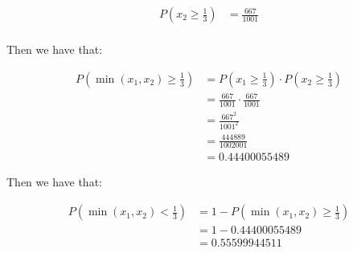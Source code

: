 \begin{equation*}
    \begin{split}
        P(x_2 \geq \frac{1}{3}) & = \frac{667}{1001} \\
    \end{split}
\end{equation*}

Then we have that:

\begin{equation*}
    \begin{split}
        P(\min(x_1, x_2) \geq \frac{1}{3}) & = P(x_1 \geq \frac{1}{3}) \cdot P(x_2 \geq \frac{1}{3}) \\
                                           & = \frac{667}{1001} \cdot \frac{667}{1001}               \\
                                           & = \frac{667^2}{1001^2}                                  \\
                                           & = \frac{444889}{1002001}                                \\
                                           & = 0.44400055489
    \end{split}
\end{equation*}

Then we have that:

\begin{equation*}
    \begin{split}
        P(\min(x_1, x_2) < \frac{1}{3}) & = 1 - P(\min(x_1, x_2) \geq \frac{1}{3}) \\
                                        & = 1 - 0.44400055489                      \\
                                        & = 0.55599944511
    \end{split}
\end{equation*}

